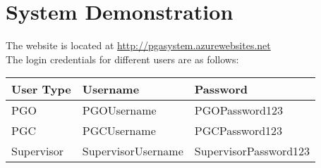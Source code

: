 \documentclass[11pt]{article}
\begin{document}
\section{System Demonstration} The website is located at \href{http://pgasystem.azurewebsites.net}{http://pgasystem.azurewebsites.net}\\
The login credentials for different users are as follows:
\begin{table}[H]
	\begin{tabular}{|l||l|l|}
		\hline
		User Type  & Username           & Password              \\ \hline
		PGO        & PGOUsername        & PGOPassword123        \\ \hline
		PGC        & PGCUsername        & PGCPassword123        \\ \hline
		Supervisor & SupervisorUsername & SupervisorPassword123 \\ \hline
	\end{tabular}
\end{table}
\end{document}
